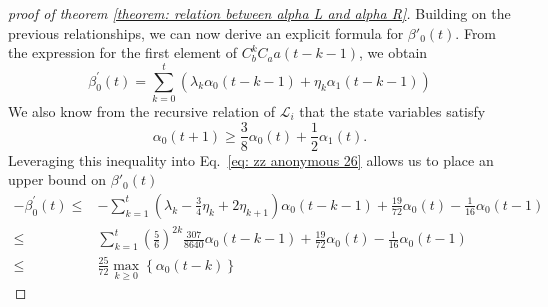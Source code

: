 \documentclass{article}
\begin{document}
\begin{proof}[proof of theorem \ref{theorem: relation between alpha L and alpha R}]
Building on the previous relationships, we can now derive an explicit formula for $\beta'_0(t)$. From the expression for the first element of $C_b^kC_aa(t-k-1)$, we obtain
\begin{equation}
    \beta_0^{\prime}(t)=\sum_{k=0}^t\left(\lambda_k \alpha_0(t-k-1)+\eta_k \alpha_1(t-k-1)\right)
    \label{eq: zz anonymous 26}
\end{equation}
We also know from the recursive relation of $\mathcal{L}_i$ that the state variables satisfy
\begin{equation}
\alpha_0(t+1) \geq \frac{3}{8} \alpha_0(t)+\frac{1}{2} \alpha_1(t).
\end{equation}
Leveraging this inequality into Eq.~\ref{eq: zz anonymous 26} allows us to place an upper bound on $\beta'_0(t)$
\begin{align}
-\beta_0^{\prime}(t) \leq & -\sum_{k=1}^t\left(\lambda_k-\frac{3}{4} \eta_k+2 \eta_{k+1}\right) \alpha_0(t-k-1)+ \frac{19}{72} \alpha_0(t) - \frac{1}{16}\alpha_0(t-1) \\
\leq & \sum_{k=1}^t\left(\frac{5}{6}\right)^{2 k} \frac{307}{8640} \alpha_0(t-k-1)+ \frac{19}{72} \alpha_0(t) - \frac{1}{16}\alpha_0(t-1) \\
\leq & \frac{25}{72} \max _{k \geq 0}\left\{\alpha_0(t-k)\right\}
\end{align}







    
\end{proof}
\end{document}
